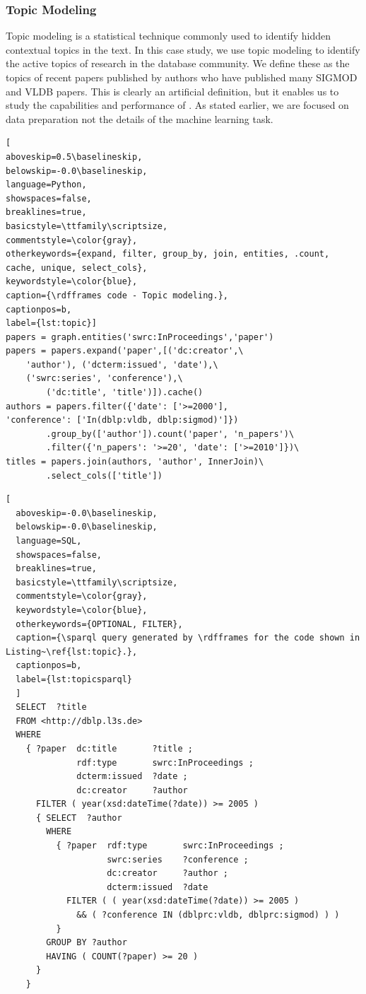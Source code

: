   \vspace*{-6pt}
\subsubsection{Topic Modeling}
\label{subsec:topicmodeling}

\vspace*{-2pt}
Topic modeling is a statistical technique commonly used to identify hidden contextual topics in the text. 
In this case study, we use topic modeling to identify the active topics of research
in the database community.
We define these as the topics of recent papers published by authors who have published many SIGMOD and VLDB papers.
This is clearly an artificial definition, but it enables us to study the capabilities and performance of \rdfframes.
As stated earlier,  we are focused on data preparation not 
the details of the machine learning task.

\begin{lstlisting}[
aboveskip=0.5\baselineskip,
belowskip=-0.0\baselineskip,
language=Python,
showspaces=false,
breaklines=true,
basicstyle=\ttfamily\scriptsize,
commentstyle=\color{gray},
otherkeywords={expand, filter, group_by, join, entities, .count, cache, unique, select_cols},
keywordstyle=\color{blue},
caption={\rdfframes code - Topic modeling.},
captionpos=b,
label={lst:topic}]
papers = graph.entities('swrc:InProceedings','paper')
papers = papers.expand('paper',[('dc:creator',\
    'author'), ('dcterm:issued', 'date'),\
    ('swrc:series', 'conference'),\
        ('dc:title', 'title')]).cache()
authors = papers.filter({'date': ['>=2000'],
'conference': ['In(dblp:vldb, dblp:sigmod)']})
        .group_by(['author']).count('paper', 'n_papers')\
        .filter({'n_papers': '>=20', 'date': ['>=2010']})\
titles = papers.join(authors, 'author', InnerJoin)\
        .select_cols(['title'])
\end{lstlisting}

\begin{lstlisting}[
  aboveskip=-0.0\baselineskip,
  belowskip=-0.0\baselineskip,
  language=SQL,
  showspaces=false,
  breaklines=true,
  basicstyle=\ttfamily\scriptsize,
  commentstyle=\color{gray},
  keywordstyle=\color{blue},
  otherkeywords={OPTIONAL, FILTER},
  caption={\sparql query generated by \rdfframes for the code shown in Listing~\ref{lst:topic}.},
  captionpos=b,
  label={lst:topicsparql}
  ]
  SELECT  ?title
  FROM <http://dblp.l3s.de>
  WHERE
    { ?paper  dc:title       ?title ;
              rdf:type       swrc:InProceedings ;
              dcterm:issued  ?date ;
              dc:creator     ?author 
      FILTER ( year(xsd:dateTime(?date)) >= 2005 )
      { SELECT  ?author
        WHERE
          { ?paper  rdf:type       swrc:InProceedings ;
                    swrc:series    ?conference ;
                    dc:creator     ?author ;
                    dcterm:issued  ?date
            FILTER ( ( year(xsd:dateTime(?date)) >= 2005 ) 
              && ( ?conference IN (dblprc:vldb, dblprc:sigmod) ) )
          }
        GROUP BY ?author
        HAVING ( COUNT(?paper) >= 20 )
      }
    }
  \end{lstlisting} 


